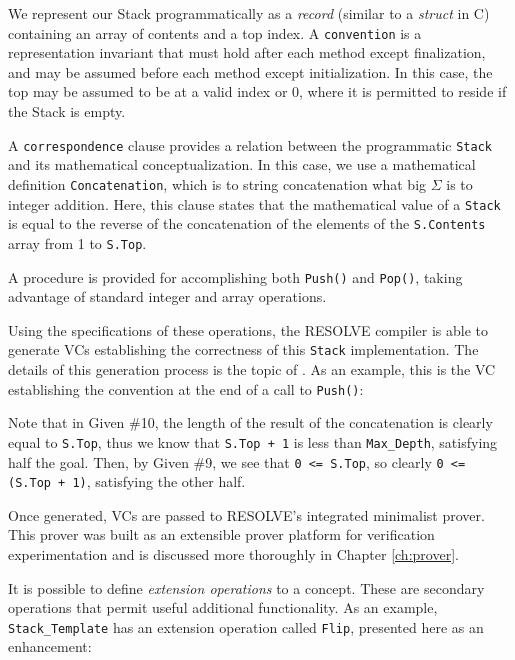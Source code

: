 

We represent our Stack programmatically as a \emph{record} (similar to a \emph{struct} in C) containing an array of contents and a top index.  A \texttt{convention} is a representation invariant that must hold after each method except finalization, and may be assumed before each method except initialization.  In this case, the top may be assumed to be at a valid index or  0, where it is permitted to reside if the Stack is empty.

A \texttt{correspondence} clause provides a relation between the programmatic \texttt{Stack} and its mathematical conceptualization.  In this case, we use a mathematical definition \texttt{Concatenation}, which is to string concatenation what big $\Sigma$ is to integer addition.  Here, this clause states that the mathematical value of a \texttt{Stack} is equal to the reverse of the concatenation of the elements of the \texttt{S.Contents} array from 1 to \texttt{S.Top}.

A procedure is provided for accomplishing both \texttt{Push()} and \texttt{Pop()}, taking advantage of standard integer and array operations.

Using the specifications of these operations, the RESOLVE compiler is able to generate VCs establishing the correctness of this \texttt{Stack} implementation.  The details of this generation process is the topic of \cite{hartonDissertation}.  As an example, this is the VC establishing the convention at the end of a call to \texttt{Push()}:



Note that in Given \#10, the length of the result of the concatenation is clearly equal to \texttt{S.Top}, thus we know that \texttt{S.Top + 1} is less than \texttt{Max\_Depth}, satisfying half the goal.  Then, by Given \#9, we see that \texttt{0 <= S.Top}, so clearly \texttt{0 <= (S.Top + 1)}, satisfying the other half.

Once generated, VCs are passed to RESOLVE's integrated minimalist prover.  This prover was built as an extensible prover platform for verification experimentation\cite{smith10} and is discussed more thoroughly in Chapter \ref{ch:prover}.

It is possible to define \emph{extension operations} to a concept.  These are secondary operations that permit useful additional functionality.  As an example, \texttt{Stack\_Template} has an extension operation called \texttt{Flip}, presented here as an enhancement:

